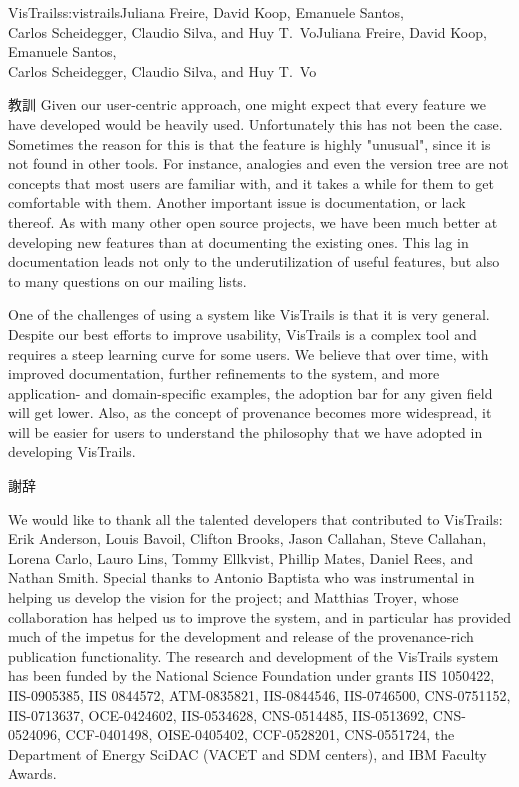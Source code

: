 \begin{aosachaptertoc}{VisTrails}{s:vistrails}{Juliana Freire, David Koop, Emanuele Santos, \\ Carlos Scheidegger, Claudio Silva, and Huy T.\ Vo}{Juliana Freire, David Koop, Emanuele Santos, \\ \hspace*{0.9cm} Carlos Scheidegger, Claudio Silva, and Huy T.\ Vo}
\begin{aosasect1}{教訓}
Given our user-centric approach, one might expect that every feature
we have developed would be heavily used. Unfortunately this has not
been the case.  Sometimes the reason for this is that the feature is
highly "unusual", since it is not found in other tools. For instance,
analogies and even the version tree are not concepts that most users
are familiar with, and it takes a while for them to get comfortable
with them. Another important issue is documentation, or lack
thereof. As with many other open source projects, we have been much
better at developing new features than at documenting the existing
ones. This lag in documentation leads not only to the underutilization
of useful features, but also to many questions on our mailing lists.

One of the challenges of using a system like VisTrails is that it is
very general. Despite our best efforts to improve usability, VisTrails
is a complex tool and requires a steep learning curve for some
users. We believe that over time, with improved documentation, further
refinements to the system, and more application- and domain-specific
examples, the adoption bar for any given field will get lower. Also,
as the concept of provenance becomes more widespread, it will be
easier for users to understand the philosophy that we have adopted in
developing VisTrails.

\begin{aosasect2}{謝辞}

We would like to thank all the talented developers that contributed to
VisTrails: Erik Anderson, Louis Bavoil, Clifton Brooks, Jason
Callahan, Steve Callahan, Lorena Carlo, Lauro Lins, Tommy Ellkvist,
Phillip Mates, Daniel Rees, and Nathan Smith. Special thanks to
Antonio Baptista who was instrumental in helping us develop the vision
for the project; and Matthias Troyer, whose collaboration has helped
us to improve the system, and in particular has provided much of the
impetus for the development and release of the provenance-rich
publication functionality. The research and development of the
VisTrails system has been funded by the National Science Foundation under grants IIS 1050422, IIS-0905385, IIS 0844572, ATM-0835821,
IIS-0844546, IIS-0746500, CNS-0751152, IIS-0713637, OCE-0424602,
IIS-0534628, CNS-0514485, IIS-0513692, CNS-0524096, CCF-0401498,
OISE-0405402, CCF-0528201, CNS-0551724,
the Department of Energy SciDAC (VACET and SDM centers), and IBM Faculty Awards.

\end{aosasect2}

\end{aosasect1}

\end{aosachaptertoc}
